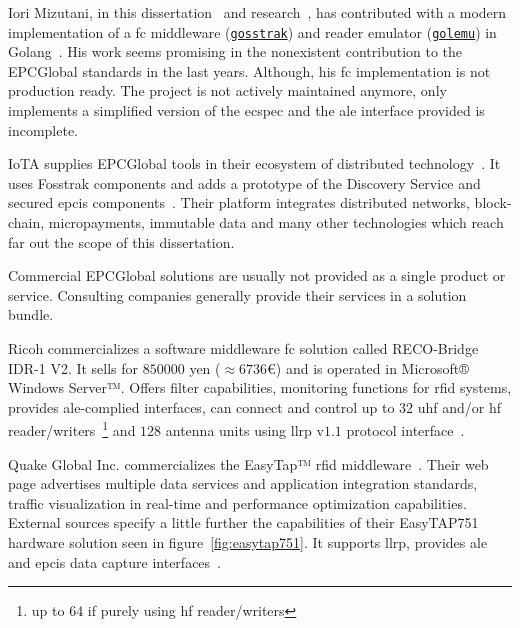 Iori Mizutani, in this dissertation~\cite{mizutaniRobustHighPerformance} and research~\cite{mizutaniMulticodePortableRFID2016b}, has contributed with a modern implementation of a \ac{fc} middleware (\href{https://github.com/iomz/gosstrak}{\texttt{gosstrak}}) and reader emulator (\href{https://github.com/iomz/golemu}{\texttt{golemu}}) in Golang~\cite{mizutaniIomzGolemu2020, mizutaniIomzGosstrak2020}. 
His work seems promising in the nonexistent contribution to the EPCGlobal standards in the last years. Although, his \ac{fc} implementation is not production ready. The project is not actively maintained anymore, only implements a simplified version of the \ac{ecspec} and the \ac{ale} interface provided is incomplete.

IoTA supplies EPCGlobal tools in their ecosystem of distributed technology~\cite{GlobalTradeSupply}. It uses Fosstrak components and adds a prototype of the Discovery Service and secured \ac{epcis} components~\cite{FosstrakSimilarProjects}. Their platform integrates distributed networks, block-chain, micropayments, immutable data and many other technologies which reach far out the scope of this dissertation.

Commercial EPCGlobal solutions are usually not provided as a single product or service. Consulting companies generally provide their services in a solution bundle.

Ricoh commercializes a software middleware \ac{fc} solution called RECO-Bridge IDR-1 V2. It sells for $850000$ yen ($\approx 6736$€) and is operated in Microsoft® Windows Server™. Offers filter capabilities, monitoring functions for \ac{rfid} systems, provides \ac{ale}-complied interfaces, can connect and control up to $32$ \ac{uhf} and/or \ac{hf} reader/writers~\footnote{up to $64$ if purely using \ac{hf} reader/writers} and $128$ antenna units using \ac{llrp} v$1.1$ protocol interface~\cite{RECOBridgeIDR1V2}.

Quake Global Inc. commercializes the EasyTap™ \ac{rfid} middleware~\cite{EasyTAPRealTime}. Their web page advertises multiple data services and application integration standards, traffic visualization in real-time and performance optimization capabilities. External sources specify a little further the capabilities of their EasyTAP751 hardware solution seen in figure~\ref{fig:easytap751}. It supports \ac{llrp}, provides \ac{ale} and \ac{epcis} data capture interfaces~\cite{RFIDEasyTAPTag}.

